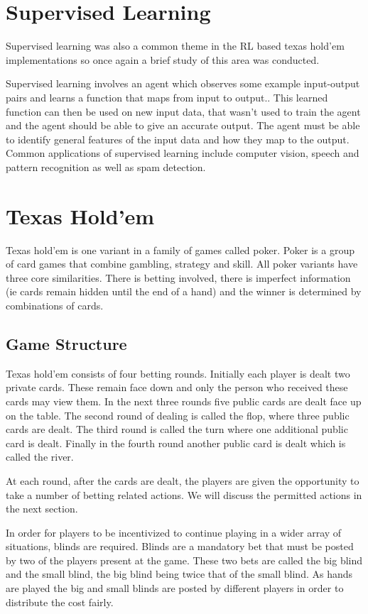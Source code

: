 \section{Supervised Learning}\label{sec:supervisedLearning}
Supervised learning was also a common theme in the RL based texas hold'em implementations so once again a
brief study of this area was conducted.

Supervised learning involves an agent which observes some example input-output pairs and learns
a function that maps from input to output.\citep{russell2016artificial}.
This learned function can then be used on new input data, that wasn't used to train the agent and the
agent should be able to give an accurate output.
The agent must be able to identify general features of the input data and how they map to the output.
Common applications of supervised learning include computer vision, speech and pattern recognition as well as
spam detection.

\section{Texas Hold'em}\label{sec:thIntro}
Texas hold'em is one variant in a family of games called poker.
Poker is a group of card games that combine gambling, strategy and skill.
All poker variants have three core similarities.
There is betting involved, there is imperfect information (ie cards remain hidden until the end of a hand)
and the winner is determined by combinations of cards.

\subsection{Game Structure}\label{subsec:bettingRounds}
Texas hold'em consists of four betting rounds.
Initially each player is dealt two private cards.
These remain face down and only the person who received these cards may view them.
In the next three rounds five public cards are dealt face up on the table.
The second round of dealing is called the flop, where three public cards are dealt.
The third round is called the turn where one additional public card is dealt.
Finally in the fourth round another public card is dealt which is called the river.

At each round, after the cards are dealt, the players are given the opportunity to take a number of betting
related actions.
We will discuss the permitted actions in the next section.

In order for players to be incentivized to continue playing in a wider array of situations, blinds are required.
Blinds are a mandatory bet that must be posted by two of the players present at the game.
These two bets are called the big blind and the small blind, the big blind being twice that of the small blind.
As hands are played the big and small blinds are posted by different players in order to distribute the cost fairly.

